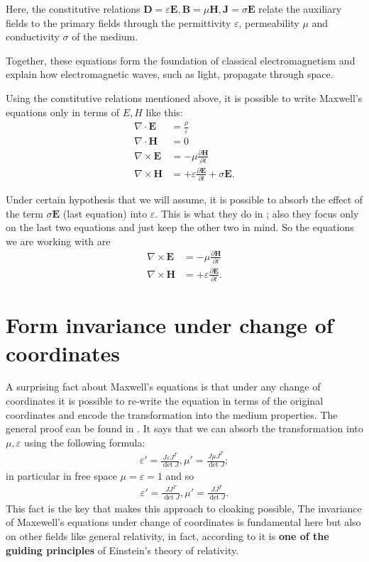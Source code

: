 \documentclass{amsart}
\begin{document}
Here, the constitutive relations \(\mathbf{D} = \varepsilon \mathbf{E},
\mathbf{B}=\mu \mathbf{H},\mathbf{J}=\sigma \mathbf{E}\) relate the auxiliary fields to the primary fields 
through the permittivity \(\varepsilon\), permeability \(\mu\) and conductivity \(\sigma\) of the medium.

Together, these equations form the foundation of classical electromagnetism and explain how electromagnetic waves, such as light, propagate through space.

\newpage

Using the constitutive relations mentioned above, it is possible to write Maxwell's equations only in terms of \(E,H\) like this:
\begin{align*}
  \nabla \cdot \mathbf{E} &=\frac{\rho}{\varepsilon}\\
  \nabla \cdot \mathbf{H} &=0\\
  \nabla \times \mathbf{E} &= -\mu\frac{\partial \mathbf{H}}{\partial t}\\
  \nabla \times \mathbf{H} &= +\varepsilon\frac{\partial \mathbf{E}}{\partial t} + \sigma \mathbf{E}.
\end{align*}

Under certain hypothesis that we will assume, it is possible to absorb the effect of
the term \(\sigma\mathbf{E}\) (last equation) into \(\varepsilon\).
This is what they do in \cite{ward96}; also they focus only on the last two equations and just keep the other two in mind.
So the equations we are working with are
\begin{align*}
  \nabla \times \mathbf{E} &= -\mu\frac{\partial \mathbf{H}}{\partial t}\\
  \nabla \times \mathbf{H} &= +\varepsilon\frac{\partial \mathbf{E}}{\partial t}.
\end{align*}

\section{Form invariance under change of coordinates} A surprising fact about Maxwell's equations is that under any change of
coordinates it is possible to re-write the equation in terms of the original coordinates and encode the transformation into
the medium properties. The general proof can be found in \cite{Johnson08}.
It says that we can absorb the transformation into \(\mu,\varepsilon\) using the following formula:
\begin{align}
\varepsilon'=\frac{J\varepsilon J^T}{\det J},\mu'=\frac{J\mu J^T}{\det J};
\end{align}
in particular in free space \(\mu=\varepsilon=1\) and so
\begin{align}
\varepsilon'=\frac{JJ^T}{\det J},\mu'=\frac{JJ^T}{\det J}.
\end{align}
This fact is the key that makes this approach to cloaking possible,
The invariance of Maxewell's equations under change of coordinates is fundamental here but also
on other fields like general relativity, in fact, according to \cite{thompson12} it is \textbf{one of the guiding principles}
of Einstein's theory of relativity.
\end{document}
